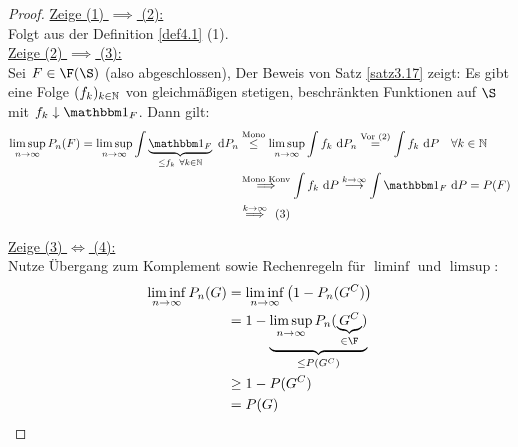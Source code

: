 \begin{proof}
\underline{Zeige (1) $\implies$ (2):}\\
Folgt aus der Definition \ref{def4.1} (1).\\

\underline{Zeige (2) $\implies$ (3):}\\
Sei $F\in\F(\S)$ (also abgeschlossen), Der Beweis von Satz \ref{satz3.17} zeigt: Es gibt eine Folge $(f_k)_{k\in\mathbb{N}}$ von gleichmäßigen stetigen, beschränkten Funktionen auf $\S$ mit $f_k\downarrow\indi_F$. Dann gilt:
\begin{align*}
\limsup\limits_{n\to\infty} P_n(F)
=\limsup\limits_{n\to\infty}\int\limits\underbrace{\indi_F}_{\leq f_k~\forall k\in\N}\d P_n
&\stackrel{\text{Mono}}{\leq}
\limsup\limits_{n\to\infty}\int\limits f_k\d P_n
\stackrel{\text{Vor (2)}}{=}
\int\limits f_k\d P\quad\forall k\in\N\\
&\stackrel{\text{Mono Konv}}{\implies}
\int\limits f_k\d P\stackrel{k\to\infty}{\longrightarrow}
\int\limits\indi_F\d P=P(F)\\
&\stackrel{k\to\infty}{\implies}~(3)
\end{align*}

\underline{Zeige (3) $\Longleftrightarrow$ (4):}\\
Nutze Übergang zum Komplement sowie Rechenregeln für $\liminf$ und $\limsup$:
\begin{align*}
\liminf\limits_{n\to\infty} P_n(G)
&=\liminf\limits_{n\to\infty} \big(1-P_n(G^C)\big)\\
&=1-\underbrace{\limsup\limits_{n\to\infty} P_n(\underbrace{G^C}_{\in\F})}_{\leq P(G^C)}\\
&\geq 1-P(G^C)\\
&=P(G)
\end{align*}


\end{proof}
